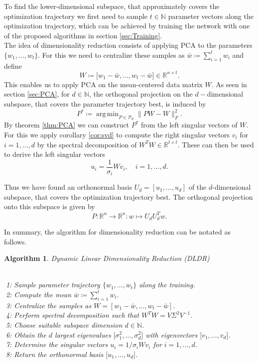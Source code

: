 \documentclass[11pt, a4paper]{article}
\newtheorem{algorithm}[theorem]{Algorithm}
\newcommand{\N}{\mathds{N}}
\newcommand{\R}{\mathds{R}}
\renewcommand{\P}{\mathcal{P}}
\DeclareMathOperator*{\argmin}{arg\,min}
\begin{document}
To find the lower-dimensional subspace, that approximately covers the optimization trajectory we first need to sample $t \in \N$ parameter vectors along the optimization trajectory, which can be achieved by training the network with one of the proposed algorithms in section \ref{sec:Training}. \\

The idea of dimensionality reduction consists of applying PCA to the parameters $\{ w_1, \dots, w_t \}$. For this we need to centralize these samples as $\bar{w} \coloneq\sum_{i=1}^{t} w_i$ and define
\[ W \coloneq \big [ w_1 - \bar{w}, \dots, w_t - \bar{w} \big ] \in \R^{n \times t}. \]
This enables us to apply PCA on the mean-centered data matrix $W$. As seen in section \ref{sec:PCA}, for $d \in \N$, the orthogonal projection on the $d-$dimensional subspace, that covers the parameter trajectory best, is induced by
\[ P^* \coloneq \argmin_{P \in \P_d} \big \| PW - W \big \|_F^2. \]
By theorem \ref{thm:PCA} we can construct $P^*$ from the left singular vectors of $W$. For this we apply corollary \ref{cor:svd} to compute the right singular vectors $v_i$ for $i=1,\dots,d$ by the spectral decomposition of $W^TW \in \R^{t \times t}$. These can then be used to derive the left singular vectors
\[ u_i = \frac{1}{\sigma_i} Wv_i, \quad i=1, \dots, d. \]

Thus we have found an orthonormal basis $U_d = [u_1, \dots, u_d]$ of the $d$-dimensional subspace, that covers the optimization trajectory best. The orthogonal projection onto this subspace is given by
\[ P : \R^n \to \R^n : w \mapsto U_dU_d^Tw. \]

In summary, the algorithm for dimensionality reduction can be notated as follows.

\begin{algorithm}
\caption{Dynamic Linear Dimensionality Reduction (DLDR)} \ \\
\textcolor{white}{$\Big |$}1: Sample parameter trajectory $\{ w_1, \dots, w_t\}$ along the training. \\
\textcolor{white}{$\Big |$}2: Compute the mean $\bar{w} \coloneq\sum_{i=1}^{t} w_i$. \\
\textcolor{white}{$\Big |$}3: Centralize the samples as $W = [w_1-\bar{w}, \dots, w_t - \bar{w}]$. \\
\textcolor{white}{$\Big |$}4: Perform spectral decomposition such that $W^TW = V \Sigma^2 V^{-1}$.  \\
\textcolor{white}{$\Big |$}5: Choose suitable subspace dimension $d \in \N$. \\
\textcolor{white}{$\Big |$}6: Obtain the $d$ largest eigenvalues $ \big [\sigma_1^2, \dots, \sigma_d^2 \big ]$ with eigenvectors $ \big [v_1, \dots, v_d \big ]$. \\
\textcolor{white}{$\Big |$}7: Determine the singular vectors $u_i = 1/\sigma_iWv_i$ for $i=1, \dots, d$. \\
\textcolor{white}{$\Big |$}8: Return the orthonormal basis $ \big [u_1, \dots, u_d \big ]$.
\end{algorithm}
\end{document}
